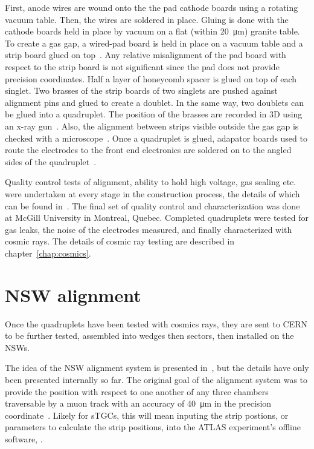 First, anode wires are wound onto the the pad cathode boards using a rotating vacuum table. Then, the wires are soldered in place. Gluing is done with the cathode boards held in place by vacuum on a flat (within \SI{20}{\micro\meter}) granite table. To create a gas gap, a wired-pad board is held in place on a vacuum table and a strip board glued on top~\cite{nsw_tdr}. Any relative misalignment of the pad board with respect to the strip board is not significant since the pad does not provide precision coordinates. Half a layer of honeycomb spacer is glued on top of each singlet. Two brasses of the strip boards of two singlets are pushed against alignment pins and glued to create a doublet. In the same way, two doublets can be glued into a quadruplet. The position of the brasses are recorded in 3D using an x-ray gun~\cite{nsw_tdr}. Also, the alignment between strips visible outside the gas gap is checked with a microscope~\cite{carlson_results_2019}. Once a quadruplet is glued, adapator boards used to route the electrodes to the front end electronics are soldered on to the angled sides of the quadruplet~\cite{nsw_tdr}. 

Quality control tests of alignment, ability to hold high voltage, gas sealing etc. were undertaken at every stage in the construction process, the details of which can be found in~\cite{nsw_tdr}. The final set of quality control and characterization was done at McGill University in Montreal, Quebec. Completed quadruplets were tested for gas leaks, the noise of the electrodes measured, and finally characterized with cosmic rays. The details of cosmic ray testing are described in chapter~\ref{chap:cosmics}.

\section{NSW alignment}

Once the quadruplets have been tested with cosmics rays, they are sent to CERN to be further tested, assembled into wedges then sectors, then installed on the NSWs. 

The idea of the NSW alignment system is presented in~\cite{nsw_tdr}, but the details have only been presented internally so far. The original goal of the alignment system was to provide the position with respect to one another of any three chambers traversable by a muon track with an accuracy of \SI{40}{\micro\meter} in the precision coordinate~\cite{nsw_tdr}. Likely for sTGCs, this will mean inputing the strip postions, or parameters to calculate the strip positions, into the ATLAS experiment's offline software, .

